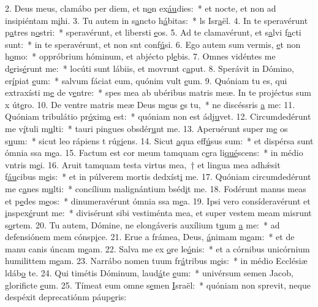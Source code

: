 2. Deus meus, clamábo per diem, et n\uline{o}n ex\uline{áu}dies:~* et nocte, et non ad insipiéntam m\uline{i}hi.
3. Tu autem in s\uline{a}ncto h\uline{á}bitas:~* ls Isr\uline{a}ël.
4. In te speravérunt p\uline{a}tres n\uline{o}stri:~* speravérunt, et libersti \uline{e}os.
5. Ad te clamavérunt, et s\uline{a}lvi f\uline{a}cti sunt:~* in te speravérunt, et non snt conf\uline{ú}si.
6. Ego autem sum vermis, \uline{e}t non h\uline{o}mo:~* oppróbrium hóminum, et abjécto pl\uline{e}bis.
7. Omnes vidéntes me d\uline{e}ris\uline{é}runt me:~* locúti sunt lábiis, et movrunt c\uline{a}put.
8. Sperávit in Dómino, er\uline{í}piat \uline{e}um:~* salvum fáciat eum, quónim vult \uline{e}um.
9. Quóniam tu es, qui extraxísti m\uline{e} de v\uline{e}ntre:~* spes mea ab ubéribus matris meæ. In te projéctus sum x út\uline{e}ro.
10. De ventre matris meæ Deus m\uline{e}us \uline{e}s tu,~* ne discéssris \uline{a} me:
11. Quóniam tribulátio pr\uline{ó}xim\uline{a} est:~* quóniam non est  ádj\uline{u}vet.
12. Circumdedérunt me v\uline{í}tuli m\uline{u}lti:~* tauri pingues obsdér\uline{u}nt me.
13. Aperuérunt super m\uline{e} os s\uline{u}um:~* sicut leo rápiens t rúg\uline{i}ens.
14. Sicut \uline{a}qua eff\uline{ú}sus sum:~* et dispérsa sunt ómnia ssa m\uline{e}a.
15. Factum est cor meum tamquam c\uline{e}ra li\uline{qué}scens:~* in médio vntris m\uline{e}i.
16. Aruit tamquam testa virtus mea,~† et lingua mea adhǽsit f\uline{áu}cibus m\uline{e}is:~* et in púlverem mortis dedxíst\uline{i} me.
17. Quóniam circumdedérunt me c\uline{a}nes m\uline{u}lti:~* concílium malignántium bséd\uline{i}t me.
18. Fodérunt manus meas et p\uline{e}des m\uline{e}os:~* dinumeravérunt ómnia ssa m\uline{e}a.
19. Ipsi vero consíderavérunt et \uline{i}nspex\uline{é}runt me:~* divisérunt sibi vestiménta mea, et super vestem meam misrunt s\uline{o}rtem.
20. Tu autem, Dómine, ne elongáveris auxílium t\uline{u}um \uline{a} me:~* ad defensiónem mem cónsp\uline{i}ce.
21. Erue a frámea, Deus, \uline{á}nimam m\uline{e}am:~* et de manu canis úncam m\uline{e}am.
22. Salva me ex \uline{o}re le\uline{ó}nis:~* et a córnibus unicórnium humilittem m\uline{e}am.
23. Narrábo nomen tuum fr\uline{á}tribus m\uline{e}is:~* in médio Ecclésiæ ldáb\uline{o} te.
24. Qui timétis Dóminum, laud\uline{á}te \uline{e}um:~* univérsum semen Jacob, glorificte \uline{e}um.
25. Tímeat eum omne s\uline{e}men \uline{I}sraël:~* quóniam non sprevit, neque despéxit deprecatiónm páup\uline{e}ris:
